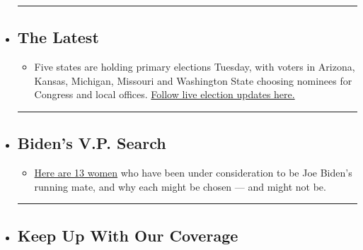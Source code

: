 \begin{itemize}
\item
  \begin{center}\rule{0.5\linewidth}{\linethickness}\end{center}

  \hypertarget{the-latest}{%
  \subsection{The Latest}\label{the-latest}}

  \begin{itemize}
  \tightlist
  \item
    Five states are holding primary elections Tuesday, with voters in
    Arizona, Kansas, Michigan, Missouri and Washington State choosing
    nominees for Congress and local offices.
    \href{https://www.nytimes3xbfgragh.onion/2020/08/04/us/elections/primary-election-michigan-arizona-kansas.html?action=click\&pgtype=Article\&state=default\&region=BELOW_MAIN_CONTENT\&context=storylines_guide}{Follow
    live election updates here.}
  \end{itemize}
\item
  \begin{center}\rule{0.5\linewidth}{\linethickness}\end{center}

  \hypertarget{bidens-vp-search}{%
  \subsection{Biden's V.P. Search}\label{bidens-vp-search}}

  \begin{itemize}
  \tightlist
  \item
    \href{https://www.nytimes3xbfgragh.onion/article/biden-vice-president-2020.html?action=click\&pgtype=Article\&state=default\&region=BELOW_MAIN_CONTENT\&context=storylines_guide}{Here
    are 13 women} who have been under consideration to be Joe Biden's
    running mate, and why each might be chosen --- and might not be.
  \end{itemize}
\item
  \begin{center}\rule{0.5\linewidth}{\linethickness}\end{center}

  \hypertarget{keep-up-with-our-coverage}{%
  \subsection{Keep Up With Our
  Coverage}\label{keep-up-with-our-coverage}}


\end{itemize}
